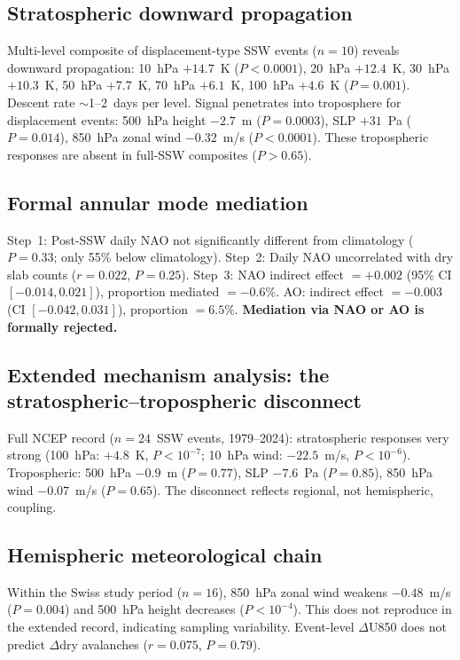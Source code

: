 \documentclass[11pt,a4paper]{article}
\begin{document}
\subsection{Stratospheric downward propagation}

Multi-level composite of displacement-type SSW events ($n = 10$) reveals downward propagation: 10~hPa $+14.7$~K ($P < 0.0001$), 20~hPa $+12.4$~K, 30~hPa $+10.3$~K, 50~hPa $+7.7$~K, 70~hPa $+6.1$~K, 100~hPa $+4.6$~K ($P = 0.001$). Descent rate $\sim$1--2~days per level. Signal penetrates into troposphere for displacement events: 500~hPa height $-2.7$~m ($P = 0.0003$), SLP $+31$~Pa ($P = 0.014$), 850~hPa zonal wind $-0.32$~m/s ($P < 0.0001$). These tropospheric responses are absent in full-SSW composites ($P > 0.65$).

\subsection{Formal annular mode mediation}

Step~1: Post-SSW daily NAO not significantly different from climatology ($P = 0.33$; only 55\% below climatology). Step~2: Daily NAO uncorrelated with dry slab counts ($r = 0.022$, $P = 0.25$). Step~3: NAO indirect effect $= +0.002$ (95\% CI $[-0.014, 0.021]$), proportion mediated $= -0.6\%$. AO: indirect effect $= -0.003$ (CI $[-0.042, 0.031]$), proportion $= 6.5\%$. \textbf{Mediation via NAO or AO is formally rejected.}

\subsection{Extended mechanism analysis: the stratospheric--tropospheric disconnect}

Full NCEP record ($n = 24$~SSW events, 1979--2024): stratospheric responses very strong (100~hPa: $+4.8$~K, $P < 10^{-7}$; 10~hPa wind: $-22.5$~m/s, $P < 10^{-6}$). Tropospheric: 500~hPa $-0.9$~m ($P = 0.77$), SLP $-7.6$~Pa ($P = 0.85$), 850~hPa wind $-0.07$~m/s ($P = 0.65$). The disconnect reflects regional, not hemispheric, coupling.

\subsection{Hemispheric meteorological chain}

Within the Swiss study period ($n = 16$), 850~hPa zonal wind weakens $-0.48$~m/s ($P = 0.004$) and 500~hPa height decreases ($P < 10^{-4}$). This does not reproduce in the extended record, indicating sampling variability. Event-level $\Delta$U850 does not predict $\Delta$dry avalanches ($r = 0.075$, $P = 0.79$).
\end{document}
